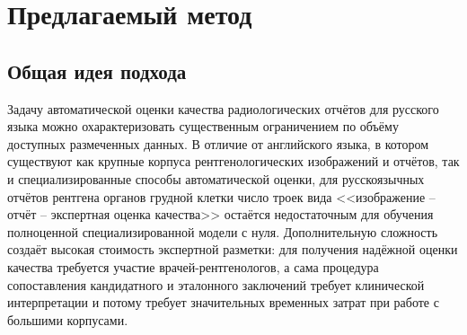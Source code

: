 
\section{Предлагаемый метод}


\subsection{Общая идея подхода}

Задачу автоматической оценки качества радиологических отчётов для русского языка можно охарактеризовать существенным ограничением по объёму доступных размеченных данных. В отличие от английского языка, в котором существуют как крупные корпуса рентгенологических изображений и отчётов, так и специализированные способы автоматической оценки, для русскоязычных отчётов рентгена органов грудной клетки число троек вида <<изображение -- отчёт -- экспертная оценка качества>> остаётся недостаточным для обучения полноценной специализированной модели с нуля. Дополнительную сложность создаёт высокая стоимость экспертной разметки: для получения надёжной оценки качества требуется участие врачей-рентгенологов, а сама процедура сопоставления кандидатного и эталонного заключений требует клинической интерпретации и потому требует значительных временных затрат при работе с большими корпусами.

